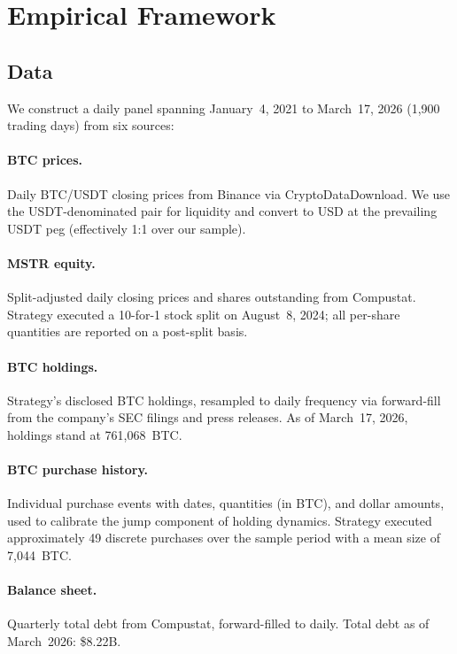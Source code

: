 
\section{Empirical Framework}\label{sec:empirical}

\subsection{Data}\label{sec:data}

We construct a daily panel spanning January~4, 2021 to March~17, 2026
(1,900 trading days) from six sources:

\paragraph{BTC prices.}
Daily BTC/USDT closing prices from Binance via CryptoDataDownload.
We use the USDT-denominated pair for liquidity and convert to USD at
the prevailing USDT peg (effectively 1:1 over our sample).

\paragraph{MSTR equity.}
Split-adjusted daily closing prices and shares outstanding from
Compustat.  Strategy executed a 10-for-1 stock split on August~8, 2024;
all per-share quantities are reported on a post-split basis.

\paragraph{BTC holdings.}
Strategy's disclosed BTC holdings, resampled to daily frequency via
forward-fill from the company's SEC filings and press releases.
As of March~17, 2026, holdings stand at 761,068~BTC.

\paragraph{BTC purchase history.}
Individual purchase events with dates, quantities (in BTC), and
dollar amounts, used to calibrate the jump component of holding
dynamics.  Strategy executed approximately 49 discrete purchases over
the sample period with a mean size of 7,044~BTC.

\paragraph{Balance sheet.}
Quarterly total debt from Compustat, forward-filled to daily.
Total debt as of March~2026: \$8.22B.

